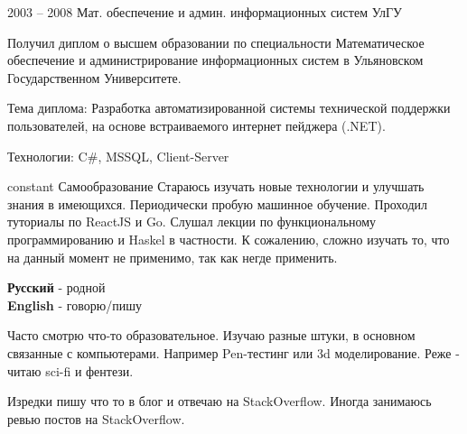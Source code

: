 \documentclass[10pt]{tpl/developercv} %
\begin{document}
\begin{entrylist}
	\entry
		{2003 -- 2008}
		{Мат. обеспечение и админ. информационных систем}
		{УлГУ}
		{Получил диплом о высшем образовании по специальности Математическое обеспечение и администрирование информационных систем в Ульяновском Государственном Университете.

		Тема диплома: Разработка автоматизированной системы технической поддержки пользователей, на основе встраиваемого интернет пейджера (.NET).

		Технологии: C\#, MSSQL, Client-Server
		}
	\entry
		{constant}
		{Самообразование}
		{}
		{Стараюсь изучать новые технологии и улучшать знания в имеющихся. Периодически пробую машинное обучение. Проходил туториалы по ReactJS и Go. Слушал лекции по функциональному программированию и Haskel в частности. К сожалению, сложно изучать то, что на данный момент не применимо, так как негде применить. }
\end{entrylist}


\begin{minipage}[t]{0.3\textwidth}
	\vspace{-\baselineskip} %


	\textbf{Русский} - родной\\
	\textbf{English} - говорю/пишу\\
\end{minipage}
\hfill
\begin{minipage}[t]{0.3\textwidth}
	\vspace{-\baselineskip} %


	Часто смотрю что-то образовательное. Изучаю разные штуки, в основном связанные с компьютерами. Например Pen-тестинг или 3d моделирование.
	Реже - читаю sci-fi и фентези.
\end{minipage}
\hfill
\begin{minipage}[t]{0.3\textwidth}
	\vspace{-\baselineskip} %


	Изредки пишу что то в блог и отвечаю на StackOverflow. Иногда занимаюсь ревью постов на StackOverflow.
\end{minipage}
\end{document}
